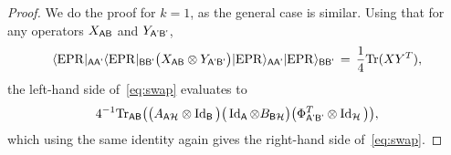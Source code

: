 \begin{proof}
We do the proof for $k=1$, as the general case is similar. Using that for any operators $X_{{\textsf{AB}}} $ and $ Y_{{\textsf{A'B'}}}$, 
$$\langle{\rm EPR}|_{{\textsf{AA'}}}\langle{\rm EPR}|_{{\textsf{BB'}}} \big( X_{{\textsf{AB}}} \otimes Y_{{\textsf{A'B'}}} \big) |{\rm EPR}\rangle_{{\textsf{AA'}}}|{\rm EPR}\rangle_{{\textsf{BB'}}} \,=\, \frac{1}{4}\mbox{\rm Tr}(XY^T),$$
the left-hand side of~\eqref{eq:swap} evaluates to 
$$4^{-1} \mbox{\rm Tr}_{{\textsf{AB}}}\big( \big(A_{{\textsf{A}}\mathcal{H}} \otimes \mathop{\rm Id}\nolimits_{\textsf{B}}\big)\big( \mathop{\rm Id}\nolimits_{\textsf{A}}\otimes B _{{\textsf{B}}\mathcal{H}}\big)\big(\Phi_{{\textsf{A'B'}}}^T\otimes \mathop{\rm Id}\nolimits_{\mathcal{H}}\big)\big),$$
 which using the same identity again 
gives the right-hand side of~\eqref{eq:swap}.
\end{proof}

